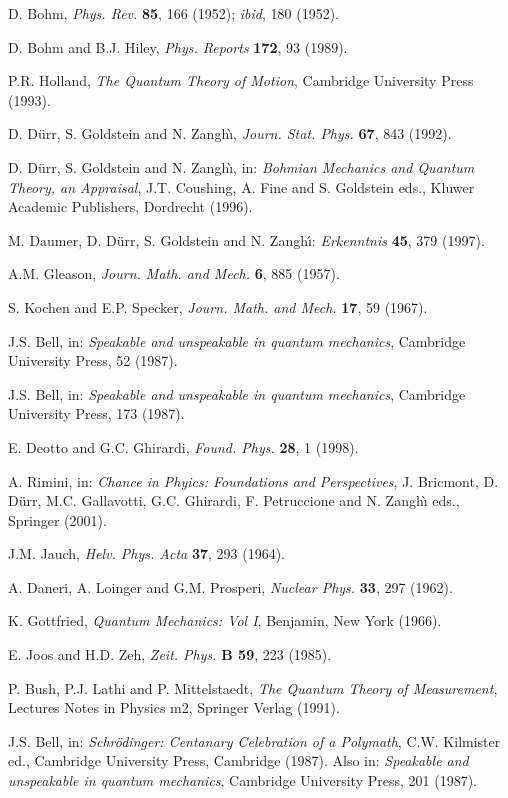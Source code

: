 \documentclass[10pt,a4paper]{article}
\begin{document}
\begin{thebibliography}{999}
 D. Bohm, {\it Phys. Rev.} {\bf 85}, 166 (1952); {\it
ibid}, 180 (1952).

 D. Bohm and B.J. Hiley, {\it Phys. Reports} {\bf 172},
93 (1989).

 P.R. Holland, {\it The Quantum Theory of Motion},
Cambridge University Press (1993).

 D. D\"urr, S. Goldstein and N. Zangh\`{\i}, {\it
Journ. Stat. Phys.} {\bf 67}, 843 (1992).

 D. D\"urr, S. Goldstein and N. Zangh\`{\i}, in:
{\it Bohmian Mechanics and Quantum Theory, an Appraisal}, J.T.
Coushing, A. Fine and S. Goldstein eds., Kluwer Academic
Publishers, Dordrecht (1996).

 M. Daumer, D. D\"{u}rr, S. Goldstein  and N.
Zangh\'{\i}: {\it Erkenntnis} {\bf 45}, 379 (1997).

 A.M. Gleason, {\it Journ. Math. and Mech.} {\bf 6}, 885
(1957).

 S. Kochen and E.P. Specker, {\it Journ. Math. and
Mech.} {\bf 17}, 59 (1967).

 J.S. Bell, in: {\it Speakable and unspeakable in
quantum mechanics}, Cambridge University Press, 52 (1987).

 J.S. Bell, in: {\it Speakable and unspeakable in
quantum mechanics}, Cambridge University Press, 173 (1987).

 E. Deotto and G.C. Ghirardi, {\it Found. Phys.} {\bf
28}, 1 (1998).

 A. Rimini, in: {\it Chance in Phyics: Foundations
and Perspectives}, J. Bricmont, D. D\"urr, M.C. Gallavotti, G.C.
Ghirardi, F. Petruccione and N. Zangh\`{\i} eds., Springer (2001).

 J.M. Jauch, {\it Helv. Phys. Acta} {\bf 37}, 293
(1964).

 A. Daneri, A. Loinger and G.M. Prosperi, {\it
Nuclear Phys.} {\bf 33}, 297 (1962).

 K. Gottfried, {\it Quantum Mechanics: Vol I},
Benjamin, New York (1966).

 E. Joos and H.D. Zeh, {\it Zeit. Phys.} {\bf B 59},
223 (1985).

 P. Bush, P.J. Lathi and P. Mittelstaedt, {\it The
Quantum Theory of Measurement}, Lectures Notes in Physics m2,
Springer Verlag (1991).

 J.S. Bell, in: {\it Schr\"odinger: Centanary
Celebration of a Polymath}, C.W. Kilmister ed., Cambridge
University Press, Cambridge (1987). Also in: {\it Speakable and
unspeakable in quantum mechanics}, Cambridge University Press, 201
(1987).


\end{thebibliography}
\end{document}
